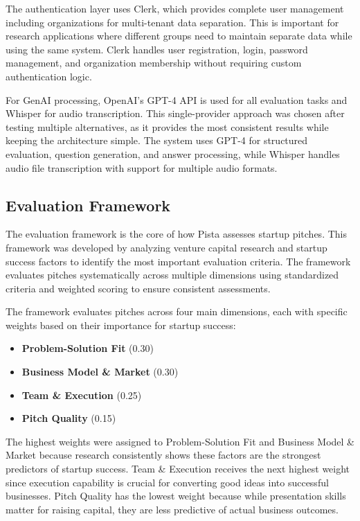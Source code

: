 The authentication layer uses Clerk, which provides complete user management including organizations for multi-tenant data separation. This is important for research applications where different groups need to maintain separate data while using the same system. Clerk handles user registration, login, password management, and organization membership without requiring custom authentication logic.

For GenAI processing, OpenAI's GPT-4 API is used for all evaluation tasks and Whisper for audio transcription. This single-provider approach was chosen after testing multiple alternatives, as it provides the most consistent results while keeping the architecture simple. The system uses GPT-4 for structured evaluation, question generation, and answer processing, while Whisper handles audio file transcription with support for multiple audio formats.

\subsection{Evaluation Framework}\label{subsec:evaluation-framework}

The evaluation framework is the core of how Pista assesses startup pitches. This framework was developed by analyzing venture capital research and startup success factors to identify the most important evaluation criteria. The framework evaluates pitches systematically across multiple dimensions using standardized criteria and weighted scoring to ensure consistent assessments.

The framework evaluates pitches across four main dimensions, each with specific weights based on their importance for startup success:

\begin{itemize}
  \item \textbf{Problem\mbox{-}Solution Fit} (0.30)
  \item \textbf{Business Model \& Market} (0.30)
  \item \textbf{Team \& Execution} (0.25)
  \item \textbf{Pitch Quality} (0.15)
\end{itemize}

The highest weights were assigned to Problem-Solution Fit and Business Model \& Market because research consistently shows these factors are the strongest predictors of startup success. Team \& Execution receives the next highest weight since execution capability is crucial for converting good ideas into successful businesses. Pitch Quality has the lowest weight because while presentation skills matter for raising capital, they are less predictive of actual business outcomes.


